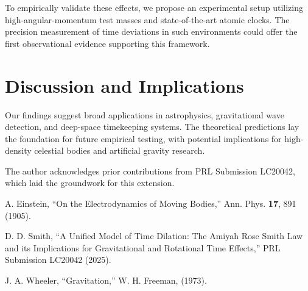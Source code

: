 \documentclass[aps,prl,twocolumn,superscriptaddress]{revtex4-2}
\begin{document}
To empirically validate these effects, we propose an experimental setup utilizing high-angular-momentum test masses and state-of-the-art atomic clocks. The precision measurement of time deviations in such environments could offer the first observational evidence supporting this framework.

\section{Discussion and Implications}

Our findings suggest broad applications in astrophysics, gravitational wave detection, and deep-space timekeeping systems. The theoretical predictions lay the foundation for future empirical testing, with potential implications for high-density celestial bodies and artificial gravity research.

\begin{acknowledgments}
The author acknowledges prior contributions from PRL Submission LC20042, which laid the groundwork for this extension.
\end{acknowledgments}

\begin{thebibliography}{9}

 A. Einstein, ``On the Electrodynamics of Moving Bodies,'' Ann. Phys. \textbf{17}, 891 (1905).

 D. D. Smith, ``A Unified Model of Time Dilation: The Amiyah Rose Smith Law and its Implications for Gravitational and Rotational Time Effects,'' PRL Submission LC20042 (2025).

 J. A. Wheeler, ``Gravitation,'' W. H. Freeman, (1973).

\end{thebibliography}
\end{document}
